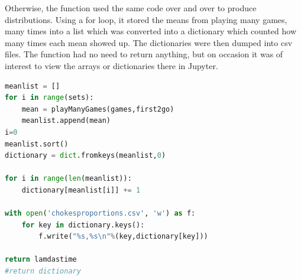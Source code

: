 \documentclass{article}
\begin{document}
Otherwise, the function used the same code over and over to produce distributions. Using a for loop, it stored the means from playing many games, many times into a list which was converted into a dictionary which counted how many times each mean showed up. The dictionaries were then dumped into csv files. The function had no need to return anything, but on occasion it was of interest to view the arrays or dictionaries there in Jupyter.
\begin{lstlisting}[language=Python]
meanlist = []
for i in range(sets):
    mean = playManyGames(games,first2go)
    meanlist.append(mean)
i=0
meanlist.sort()
dictionary = dict.fromkeys(meanlist,0)

for i in range(len(meanlist)):
    dictionary[meanlist[i]] += 1

with open('chokesproportions.csv', 'w') as f:
    for key in dictionary.keys():
        f.write("%s,%s\n"%(key,dictionary[key]))

return lamdastime
#return dictionary
\end{lstlisting}
\end{document}
